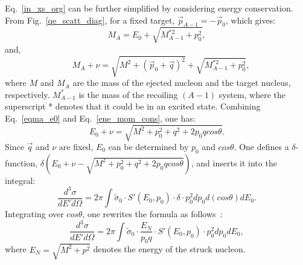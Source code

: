 Eq.~\eqref{in_xs_org} can be further simplified by considering energy conservation. From Fig.~\ref{qe_scatt_diag}, for a fixed target, $\vec{p}_{A-1} = - \vec{p}_{0}$, which gives: 
\begin{equation}
  M_{A}= E_{0}+ \sqrt{M_{A-1}^{*2}+p_{0}^{2}},
  \label{eqma_e0}
\end{equation}
and,
\begin{equation}
  \quad  M_{A}+\nu = \sqrt{M^{2}+(\vec{p}_{0}+\vec{q})^{2}}+\sqrt{M_{A-1}^{*2}+p_{0}^{2}},
  \label{ene_mom_cons}
\end{equation}
where $M$ and $M_{A}$ are the mass of the ejected nucleon and the target nucleus, respectively. $M_{A-1}^{*}$ is the mass of the recoiling $(A-1)$ system, where the superscript * denotes that it could be in an excited state. Combining Eq.~\eqref{eqma_e0} and Eq.~\eqref{ene_mom_cons}, one has:
\begin{equation}
 E_{0} + \nu = \sqrt{M^{2}+p_{0}^{2}+q^{2}+2p_{0}qcos\theta}.
\end{equation}
Since $\vec{q}$ and $\nu$ are fixed, $E_{0}$ can be determined by $p_{0}$ and $cos\theta$. One defines a $\delta$-function, $\delta(E_{0}+\nu-\sqrt{M^{2}+p_{0}^{2}+q^{2}+2p_{0}qcos\theta})$, and inserts it into the integral:
\begin{equation}
  \frac{d^{3}\sigma}{dE'd\Omega} = 2\pi \int \tilde{\sigma}_{0}\cdot S'(E_{0},p_{0})\cdot \delta \cdot p_{0}^{2}dp_{0}d(cos\theta)dE_{0}.
  \label{in_xs_org2}
\end{equation}
Integrating over $cos\theta$, one rewrites the formula as follows~\cite{john_thesis}:
\begin{equation}
  \frac{d^{3}\sigma}{dE'd\Omega} = 2\pi \int \tilde{\sigma}_{0}\cdot \frac{E_{N}}{p_{0}q} \cdot S'(E_{0},p_{0})\cdot p_{0}^{2}dp_{0}dE_{0},
\end{equation}
where $E_{N}=\sqrt{M^{2}+p^{2}}$ denotes the energy of the struck nucleon.

